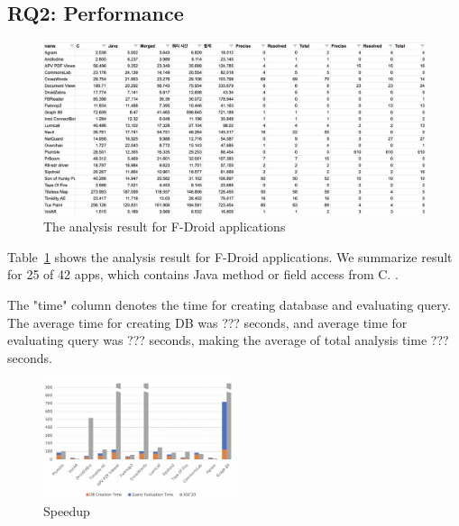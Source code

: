 \subsection{RQ2: Performance}
\begin{figure}[t]
  \centering
  \vspace{2mm}
  \includegraphics[width=\textwidth]{img/table2}
  \vspace*{-1.5em}
  \caption{The analysis result for F-Droid applications}
  \label{fig:table2}
\vspace*{-.5em}
\end{figure}

Table~\ref{fig:table2} shows the analysis result for F-Droid applications. We summarize
result for 25 of 42 apps, which contains Java method or field access
from C. .

The "time" column denotes the time for creating database and evaluating query.
The average time for creating DB was ??? seconds, and average time for
evaluating query was ???  seconds, making the average of total analysis time
??? seconds. 

\begin{figure}[t]
  \centering
  \vspace{2mm}
  \includegraphics[width=0.5\textwidth]{img/graph}
  \vspace*{-1.5em}
  \caption{Speedup}
  \label{fig:graph}
\vspace*{-.5em}
\end{figure}

